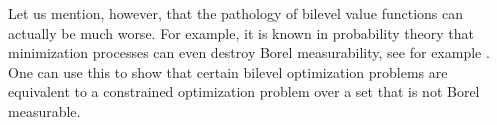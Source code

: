 \documentclass{article}
\theoremstyle{plain}
\theoremstyle{definition}
\begin{document}
{Let us mention, however, that the pathology of bilevel value functions can actually be much worse. %
For example, it is known in probability theory that minimization processes can even destroy Borel measurability, see for example \cite[Chapter 7]{bertsekas1996stochastic}. One can use this to show that certain bilevel optimization problems are equivalent to a constrained optimization problem over a set that is not Borel measurable. }%
\end{document}
